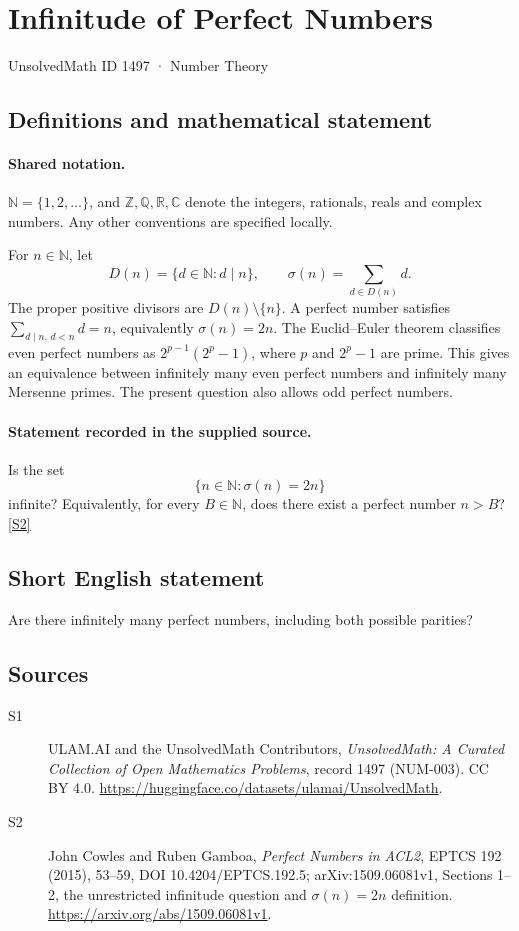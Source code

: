 \documentclass[11pt]{article}
\newcommand{\sref}[2]{\hyperlink{source:#1:#2}{[S#2]}}
\begin{document}
\setcounter{section}{1496}
\section{Infinitude of Perfect Numbers}\label{1497}
{\small\sffamily UnsolvedMath ID 1497 · Number Theory}
\subsection{Definitions and mathematical statement}

\paragraph{Shared notation.}$\mathbb N=\{1,2,\ldots\}$, and $\mathbb Z,\mathbb Q,\mathbb R,\mathbb C$ denote the integers, rationals, reals and complex numbers. Any other conventions are specified locally.


For \(n\in\mathbb N\), let
\[
 D(n)=\{d\in\mathbb N:d\mid n\},\qquad
 \sigma(n)=\sum_{d\in D(n)}d.
\]
The proper positive divisors are \(D(n)\setminus\{n\}\).
A perfect number satisfies \(\sum_{d\mid n,\,d<n}d=n\), equivalently
\(\sigma(n)=2n\).
The Euclid--Euler theorem classifies even perfect numbers as
\(2^{p-1}(2^p-1)\), where \(p\) and \(2^p-1\) are prime.
This gives an equivalence between infinitely many even perfect numbers
and infinitely many Mersenne primes. The present question also allows
odd perfect numbers.
\paragraph{Statement recorded in the supplied source.}
Is the set
\[
                    \{n\in\mathbb N:\sigma(n)=2n\}
\]
infinite? Equivalently, for every \(B\in\mathbb N\), does there exist
a perfect number \(n>B\)? \sref{1497}{2}
\subsection{Short English statement}
Are there infinitely many perfect numbers, including both possible parities?
\subsection{Sources}
\begin{description}
\item[\hypertarget{source:1497:1}{S1}] ULAM.AI and the UnsolvedMath Contributors, \emph{UnsolvedMath: A Curated Collection of Open Mathematics Problems}, record 1497 (NUM-003). CC BY 4.0. \url{https://huggingface.co/datasets/ulamai/UnsolvedMath}.
\item[\hypertarget{source:1497:2}{S2}] John Cowles and Ruben Gamboa, \emph{Perfect Numbers in ACL2}, EPTCS 192 (2015), 53--59, DOI 10.4204/EPTCS.192.5; arXiv:1509.06081v1, Sections 1--2, the unrestricted infinitude question and $\sigma(n)=2n$ definition. \url{https://arxiv.org/abs/1509.06081v1}.
\end{description}
\label{end:1497}
\end{document}
